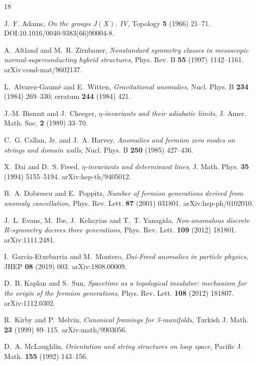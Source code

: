 \documentclass[11pt]{article}
\theoremstyle{definition}
\theoremstyle{remark}
\begin{document}
\begin{thebibliography}{18}

J.~F. Adams, \emph{On the groups $J(X)$. IV}, Topology \textbf{5} (1966) 21--71.
DOI:10.1016/0040-9383(66)90004-8.

A.~Altland and M.~R. Zirnbauer, \emph{Nonstandard symmetry classes in mesoscopic normal-superconducting hybrid
structures}, Phys. Rev. B \textbf{55} (1997) 1142--1161. arXiv:cond-mat/9602137.

L.~Alvarez-Gaum\'e and E.~Witten, \emph{Gravitational anomalies}, Nucl. Phys. B \textbf{234} (1984) 269--330;
erratum \textbf{244} (1984) 421.

J.-M. Bismut and J.~Cheeger, \emph{$\eta$-invariants and their adiabatic limits}, J. Amer. Math. Soc.
\textbf{2} (1989) 33--70.

C.~G. Callan, Jr. and J.~A. Harvey, \emph{Anomalies and fermion zero modes on strings and domain walls}, Nucl.
Phys. B \textbf{250} (1985) 427--436.

X.~Dai and D.~S. Freed, \emph{$\eta$-invariants and determinant lines}, J. Math. Phys. \textbf{35} (1994)
5155--5194. arXiv:hep-th/9405012.

B.~A. Dobrescu and E.~Poppitz, \emph{Number of fermion generations derived from anomaly cancellation}, Phys.
Rev. Lett. \textbf{87} (2001) 031801. arXiv:hep-ph/0102010.

J.~L. Evans, M.~Ibe, J.~Kehayias and T.~T. Yanagida, \emph{Non-anomalous discrete $R$-symmetry decrees three
generations}, Phys. Rev. Lett. \textbf{109} (2012) 181801. arXiv:1111.2481.

I.~Garc\'ia-Etxebarria and M.~Montero, \emph{Dai-Freed anomalies in particle physics}, JHEP \textbf{08} (2019)
003. arXiv:1808.00009.

D.~B. Kaplan and S.~Sun, \emph{Spacetime as a topological insulator: mechanism for the origin of the fermion
generations}, Phys. Rev. Lett. \textbf{108} (2012) 181807. arXiv:1112.0302.

R.~Kirby and P.~Melvin, \emph{Canonical framings for 3-manifolds}, Turkish J. Math. \textbf{23} (1999) 89--115.
arXiv:math/9903056.

D.~A. McLaughlin, \emph{Orientation and string structures on loop space}, Pacific J. Math. \textbf{155} (1992)
143--156.


\end{thebibliography}
\end{document}

